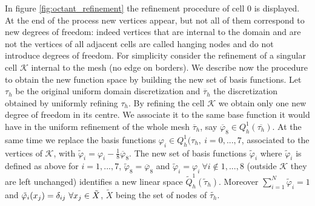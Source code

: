\documentclass[11pt,a4paper]{article}
\begin{document}
In figure \ref{fig:octant_refinement} the refinement procedure of cell 0 is displayed. At the end of the process new vertices appear, but not all of them correspond to new degrees of freedom: indeed vertices that are internal to the domain and are not the vertices of all adjacent cells are called hanging nodes and do not introduce degrees of freedom. For simplicity consider the refinement of a singular cell \(\mathcal{K}\) internal to the mesh (no edge on borders). We describe now the procedure to obtain the new function space by building the new set of basis functions. Let \(\tau_h\) be the original uniform domain discretization and \(\overline{\tau}_h\) the discretization obtained by uniformly refining \(\tau_h\). By refining the cell \(\mathcal{K}\) we obtain only one new degree of freedom in its centre. We associate it to the same base function it would have in the uniform refinement of the whole mesh \(\overline{\tau}_h\), say \(\overline{\varphi}_8\in Q_h^1(\overline{\tau_h})\). At the same time we replace the basis functions \(\varphi_i \in Q_h^1(\tau_h,\ i=0,...,7\), associated to the vertices of \(\mathcal{K}\), with \(\tilde{\varphi}_i=\varphi_i-\frac{1}{8}\overline{\varphi}_8\). The new set of basis functions \(\tilde{\varphi}_i\) where \(\tilde{\varphi}_i\) is defined as above for \(i=1,...,7\), \(\tilde{\varphi}_8=\overline{\varphi}_8\) and \(\tilde{\varphi}_i = \varphi_i\ \forall i \notin 1,...,8\) (outside \(\mathcal{K}\) they are left unchanged) identifies a new linear space \(\tilde{Q}_h^1(\tilde{\tau}_h)\). Moreover \(\sum_{i=1}^N\tilde{\varphi}_i=1\) and \(\Tilde{\varphi}_i(x_j)=\delta_{ij}\ \forall x_j\in \tilde{X}\), \(\tilde{X}\) being the set of nodes of \(\tilde{\tau_h}\).
\end{document}
